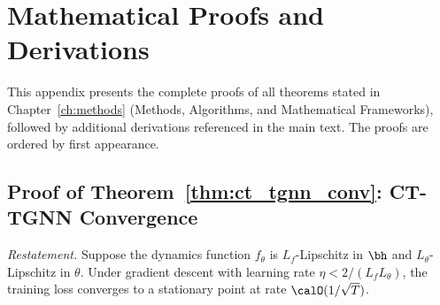
\chapter{Mathematical Proofs and Derivations}
\label{app:proofs}

This appendix presents the complete proofs of all theorems stated in Chapter~\ref{ch:methods} (Methods, Algorithms, and Mathematical Frameworks), followed by additional derivations referenced in the main text. The proofs are ordered by first appearance.


\section{Proof of Theorem~\ref{thm:ct_tgnn_conv}: CT-TGNN Convergence}
\label{app:proof_ct_conv}

\noindent\textit{Restatement.} Suppose the dynamics function $f_\theta$ is $L_f$-Lipschitz in $\bh$ and $L_\theta$-Lipschitz in $\theta$. Under gradient descent with learning rate $\eta<2/(L_f L_\theta)$, the training loss converges to a stationary point at rate $\calO(1/\sqrt{T})$.

